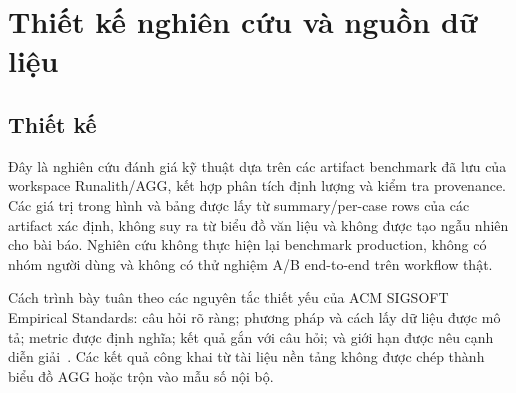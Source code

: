 \documentclass[11pt,a4paper]{article}
\begin{document}
\section{Thiết kế nghiên cứu và nguồn dữ liệu}

\subsection{Thiết kế}
Đây là nghiên cứu đánh giá kỹ thuật dựa trên các artifact benchmark đã lưu của workspace Runalith/AGG, kết hợp phân tích định lượng và kiểm tra provenance. Các giá trị trong hình và bảng được lấy từ summary/per-case rows của các artifact xác định, không suy ra từ biểu đồ văn liệu và không được tạo ngẫu nhiên cho bài báo. Nghiên cứu không thực hiện lại benchmark production, không có nhóm người dùng và không có thử nghiệm A/B end-to-end trên workflow thật.

Cách trình bày tuân theo các nguyên tắc thiết yếu của ACM SIGSOFT Empirical Standards: câu hỏi rõ ràng; phương pháp và cách lấy dữ liệu được mô tả; metric được định nghĩa; kết quả gắn với câu hỏi; và giới hạn được nêu cạnh diễn giải \,\cite{acmsigsoftstandards}. Các kết quả công khai từ tài liệu nền tảng không được chép thành biểu đồ AGG hoặc trộn vào mẫu số nội bộ.
\end{document}
